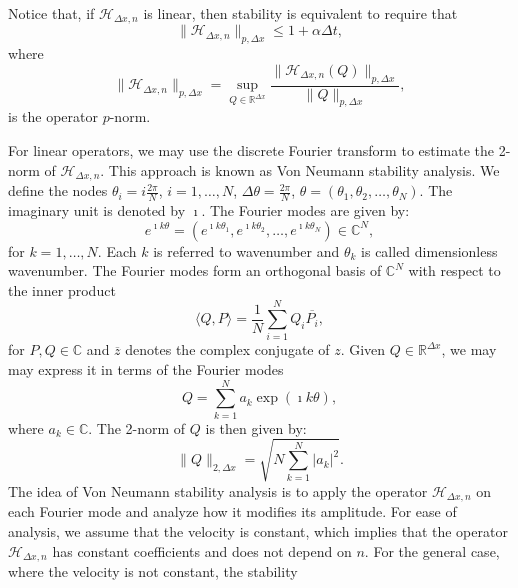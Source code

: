 Notice that, if $\mathcal{H}_{\Delta x,n}$ is linear, then stability is equivalent to require that
\begin{equation*}
	\|\mathcal{H}_{\Delta x,n}\|_{p,\Delta x} \leq 1+ \alpha \Delta t,
\end{equation*}
where
\begin{equation*}
	\|\mathcal{H}_{\Delta x,n}\|_{p,\Delta x} = \sup_{Q\in \mathbb{R}^{\Delta x}} \frac{\|\mathcal{H}_{\Delta x,n}(Q)\|_{p,\Delta x}}{\|Q\|_{p,\Delta x}},
\end{equation*}
is the operator $p$-norm.

For linear operators, we may use the discrete Fourier transform \citep{trefethen:2000}
to estimate the 2-norm of $\mathcal{H}_{\Delta x,n}$. This approach is known as Von Neumann stability analysis.
We define the nodes $\theta_i = i\frac{2\pi}{N}$, $i=1, \ldots, N$, $\Delta \theta = \frac{2\pi}{N}$,
$\theta = (\theta_1, \theta_2, \ldots, \theta_N)$.
The imaginary unit is denoted by $\imath$.
The Fourier modes are given by:
\begin{equation*}
	e^{\imath k \theta} = (e^{\imath k\theta_1}, e^{\imath k\theta_2}, \ldots, e^{\imath k\theta_N}) \in \mathbb{C}^N, 
\end{equation*}
for $k=1, \ldots, N$. 
Each $k$ is referred to wavenumber and $\theta_k$ is called  dimensionless wavenumber.
The Fourier modes form an orthogonal basis of $\mathbb{C}^N$ with respect to the 
inner product
\begin{equation*}
	\langle Q, P \rangle = \frac{1}{N}\sum_{i=1}^{N}{Q_i \overline{P_i}},
\end{equation*}
for $P, Q \in \mathbb{C}$ and $\overline{z}$ denotes the complex conjugate of $z$. 
Given $Q \in \mathbb{R}^{\Delta x}$, we may may express it in terms of the Fourier modes
\begin{equation*}
	Q = \sum_{k=1}^{N} a_k \exp(\imath k \theta),
\end{equation*}
where $a_k \in \mathbb{C}$. The 2-norm of $Q$ is then given by:
\begin{equation*}
	\|Q\|_{2,\Delta x} = \sqrt{N \sum_{k=1}^{N} |a_k|^2}.
\end{equation*}
The idea of Von Neumann stability analysis is to apply the operator $\mathcal{H}_{\Delta x,n}$ on each Fourier mode and
analyze how it modifies its amplitude.
For ease of analysis, we assume that the velocity is constant, which implies that
the operator $\mathcal{H}_{\Delta x,n}$ has constant coefficients and does not depend on $n$.
For the general case, where the velocity is not constant, the stability
